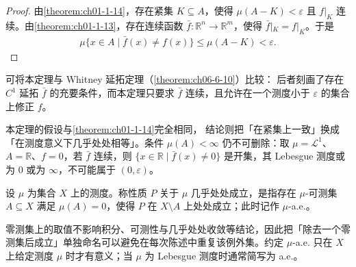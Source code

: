 \documentclass[../../main.tex]{subfiles}%
\begin{document}
\begin{proof}
由\cref{theorem:ch01-1-14}，存在紧集 $K\subseteq A$，使得 $\mu(A-K)<\varepsilon$ 且 $f|_K$ 连续。由\cref{theorem:ch01-1-13}，存在连续函数 $\bar f:\mathbb{R}^n\to\mathbb{R}^m$，使得 $\bar f|_K=f|_K$。于是 %
\begin{align*}
\mu\bigl\{x\in A\mid\bar f(x)\neq f(x)\bigr\}\leqslant\mu(A-K)<\varepsilon.
\end{align*}
\end{proof}

\begin{remark}\label{remark:ch01-thm-1-15-比较}
可将本定理与 Whitney 延拓定理（\cref{theorem:ch06-6-10}）比较： 后者刻画了存在 $C^1$ 延拓 $\bar f$ 的充要条件，而本定理只要求 $\bar f$ 连续，且允许在一个测度小于 $\varepsilon$ 的集合上修正 $f$。 %
\end{remark}

\begin{remark}\label{remark:ch01-thm-1-15-条件}
本定理的假设与\cref{theorem:ch01-1-14}完全相同， 结论则把「在紧集上一致」换成「在测度意义下几乎处处相等」。条件 $\mu(A)<\infty$ 仍不可删除：取 $\mu=\mathcal{L}^1$、$A=\mathbb{R}$、$f=0$，若 $\bar f$ 连续，则 $\{x\in\mathbb{R}\mid\bar f(x)\neq0\}$ 是开集，其 Lebesgue 测度或为 $0$ 或为 $\infty$，不可能属于 $(0,\varepsilon)$。 %
\end{remark}

\begin{definition*}[几乎处处]\label{definition:ch01-1-a-e}
设 $\mu$ 为集合 $X$ 上的测度。称性质 $P$ 关于 $\mu$ 几乎处处成立，是指存在 $\mu$-可测集 $A\subseteq X$ 满足 $\mu(A)=0$，使得 $P$ 在 $X\setminus A$ 上处处成立；此时记作 $\mu$-a.e.。
\end{definition*}

\begin{remark}\label{remark:ch01-1-a-e-条件}
零测集上的取值不影响积分、可测性与几乎处处收敛等结论，因此把「除去一个零测集后成立」单独命名可以避免在每次陈述中重复该例外集。约定 $\mu$-a.e. 只在 $X$ 上给定测度 $\mu$ 时才有意义；当 $\mu$ 为 Lebesgue 测度时通常简写为 a.e.。
\end{remark}
\end{document}
